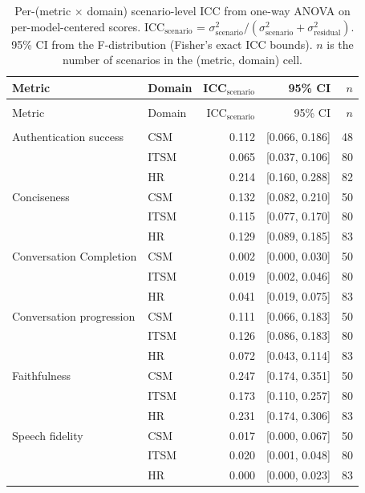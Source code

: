 \begingroup\footnotesize
\begin{longtable}{>{\raggedright\arraybackslash}p{1.8cm}lrrr}
\caption{Per-(metric $\times$ domain) scenario-level ICC from one-way ANOVA on per-model-centered scores. ICC$_\text{scenario}$ = $\sigma^2_\text{scenario} / (\sigma^2_\text{scenario} + \sigma^2_\text{residual})$. 95\% CI from the F-distribution (Fisher's exact ICC bounds). $n$ is the number of scenarios in the (metric, domain) cell.}
\label{tab:icc-pooled} \\
\toprule
Metric & Domain & ICC$_\text{scenario}$ & 95\% CI & $n$ \\
\midrule
\endfirsthead
\multicolumn{5}{l}{\emph{Table~\ref{tab:icc-pooled} continued from previous page}} \\
\toprule
Metric & Domain & ICC$_\text{scenario}$ & 95\% CI & $n$ \\
\midrule
\endhead
\midrule \multicolumn{5}{r}{\emph{continued on next page}} \\
\endfoot
\bottomrule
\endlastfoot
Authentication success & CSM & 0.112 & [0.066, 0.186] & 48 \\
 & ITSM & 0.065 & [0.037, 0.106] & 80 \\
 & HR & 0.214 & [0.160, 0.288] & 82 \\
\midrule
Conciseness & CSM & 0.132 & [0.082, 0.210] & 50 \\
 & ITSM & 0.115 & [0.077, 0.170] & 80 \\
 & HR & 0.129 & [0.089, 0.185] & 83 \\
\midrule
Conversation Completion & CSM & 0.002 & [0.000, 0.030] & 50 \\
 & ITSM & 0.019 & [0.002, 0.046] & 80 \\
 & HR & 0.041 & [0.019, 0.075] & 83 \\
\midrule
Conversation progression & CSM & 0.111 & [0.066, 0.183] & 50 \\
 & ITSM & 0.126 & [0.086, 0.183] & 80 \\
 & HR & 0.072 & [0.043, 0.114] & 83 \\
\midrule
Faithfulness & CSM & 0.247 & [0.174, 0.351] & 50 \\
 & ITSM & 0.173 & [0.110, 0.257] & 80 \\
 & HR & 0.231 & [0.174, 0.306] & 83 \\
\midrule
Speech fidelity & CSM & 0.017 & [0.000, 0.067] & 50 \\
 & ITSM & 0.020 & [0.001, 0.048] & 80 \\
 & HR & 0.000 & [0.000, 0.023] & 83 \\

\end{longtable}
